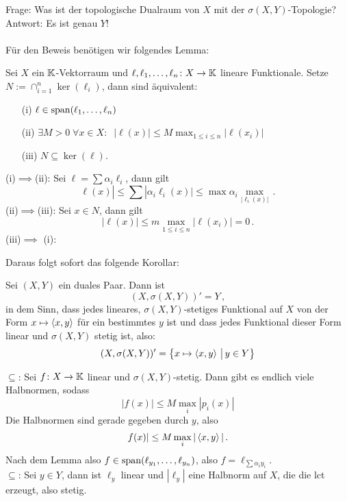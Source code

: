 \documentclass{article}
\begin{document}
	Frage: Was ist der topologische Dualraum von $X$ mit der $\sigma(X,Y)$-Topologie?\\
	Antwort: Es ist genau $Y$!\\
	\\
	Für den Beweis benötigen wir folgendes Lemma:
	\begin{Lemma}{}{}
		Sei $X$ ein $\operatorname{\mathbb K}$-Vektorraum und $\ell,\ell_1,\ldots,\ell_n\colon X\to \operatorname{\mathbb K}$ lineare Funktionale. Setze $N:=\cap_{i=1}^n\ker(\ell_i)$, dann sind äquivalent:
		\begin{itemize}
			\item[(i)] $\ell\in \operatorname{\mathrm{span}}(\ell_1,\ldots,\ell_n)$
			\item[(ii)] $\exists M>0\;\forall x\in X:\;\;|\ell(x)|\le M\max_{1\le i\le n}|\ell(x_i)|$
			\item[(iii)] $N\subseteq \ker(\ell)$.
		\end{itemize} 
	\end{Lemma}
	
	\begin{Beweis}
		(i)$\implies$(ii): Sei $\ell=\sum \alpha_i\ell_i$, dann gilt
		\[\ell(x)|\le \sum |\alpha_i\ell_i(x)|\le \max \alpha_i\max_{|\ell_i(x)|}\,.\]
		(ii)$\implies$(iii): Sei $x\in N$, dann gilt
		\[|\ell(x)|\le m\max_{1\le i\le n}|\ell(x_i)|=0\,.\]
		(iii)$\implies$ (i):
	\end{Beweis}
	
	Daraus folgt sofort das folgende Korollar:
	
	\begin{Kor}{}{}
		Sei $(X,Y)$ ein duales Paar. Dann ist
		\[(X,\sigma(X,Y))'=Y\,,\]
		in dem Sinn, dass jedes lineares, $\sigma(X,Y)$-stetiges Funktional auf $X$ von der Form $x\mapsto \left\langle x,y\right\rangle$ für ein bestimmtes $y$ ist und dass jedes Funktional dieser Form linear und $\sigma(X,Y)$ stetig ist, also:
		\[(X,\sigma(X,Y))'=\left\{x\mapsto \left\langle x,y\right\rangle\,\big|\, y\in Y\right\}\]
	\end{Kor}
	
	\begin{Beweis}
	 $\subseteq$: Sei $f\colon X\to \operatorname{\mathbb K}$ linear und $\sigma(X,Y)$-stetig. Dann gibt es endlich viele Halbnormen, sodass
	 \[|f(x)|\le M\max_{i}|p_i(x)|\]
	 Die Halbnormen sind gerade gegeben durch $y$, also
	 \[f(x)|\le M\max_i |\left\langle x,y\right\rangle|\,.\]
	 Nach dem Lemma also $f\in \operatorname{\mathrm{span}}(\ell_{y_1},\ldots,\ell_{y_n})$, also $f=\ell_{\sum \alpha_iy_i}$.\\
	 $\subseteq$: Sei $y\in Y$, dann ist $\ell_y$ linear und $|\ell_y|$ eine Halbnorm auf $X$, die die lct erzeugt, also stetig.
	\end{Beweis}
	
\end{document}
